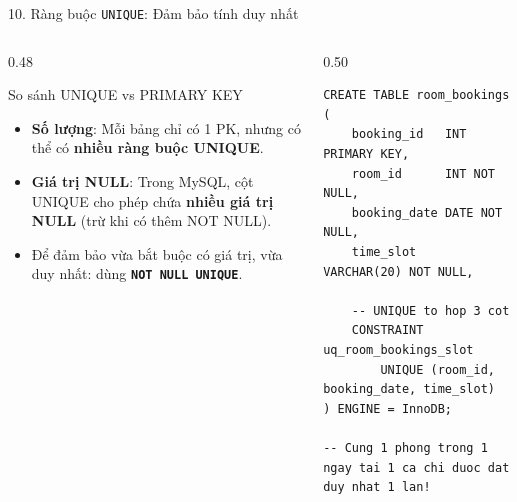 \documentclass[aspectratio=169,11pt]{beamer}
\newcommand{\kw}[1]{\textcolor{dbblue}{\textbf{#1}}}
\begin{document}
\begin{frame}[fragile]{10. Ràng buộc \texttt{UNIQUE}: Đảm bảo tính duy nhất}
\begin{columns}[t]
  \begin{column}{0.48\textwidth}
    \begin{block}{So sánh UNIQUE vs PRIMARY KEY}
      \begin{itemize}\setlength{\itemsep}{1.5pt}
        \item \textbf{Số lượng}: Mỗi bảng chỉ có 1 PK, nhưng có thể có \kw{nhiều ràng buộc UNIQUE}.
        \item \textbf{Giá trị NULL}: Trong MySQL, cột UNIQUE cho phép chứa \kw{nhiều giá trị NULL} (trừ khi có thêm NOT NULL).
        \item Để đảm bảo vừa bắt buộc có giá trị, vừa duy nhất: dùng \kw{\texttt{NOT NULL UNIQUE}}.
      \end{itemize}
    \end{block}
  \end{column}
  \begin{column}{0.50\textwidth}
\begin{lstlisting}
CREATE TABLE room_bookings (
    booking_id   INT PRIMARY KEY,
    room_id      INT NOT NULL,
    booking_date DATE NOT NULL,
    time_slot    VARCHAR(20) NOT NULL,
    
    -- UNIQUE to hop 3 cot
    CONSTRAINT uq_room_bookings_slot
        UNIQUE (room_id, booking_date, time_slot)
) ENGINE = InnoDB;

-- Cung 1 phong trong 1 ngay tai 1 ca chi duoc dat duy nhat 1 lan!
\end{lstlisting}
  \end{column}
\end{columns}
\end{frame}

\end{document}

